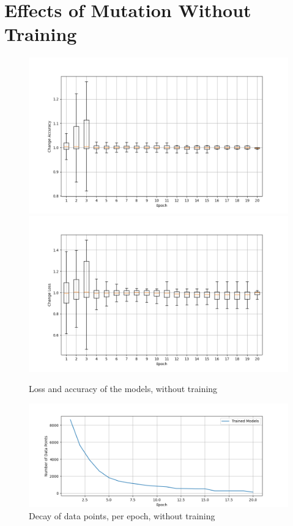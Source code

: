 \section{Effects of Mutation Without Training}\label{sec:effects-of-mutation-without-training}
\begin{figure}
    \centering
    \includegraphics[width=\textwidth]{plots/NotTrained_Change_Acc.png}
    \includegraphics[width=\textwidth]{plots/NotTrained_Change_Loss.png}
    \caption{Loss and accuracy of the models, without training}
    \label{fig:loss-accuracy-Notraining}
\end{figure}
\begin{figure}
    \centering
    \includegraphics[width=\textwidth]{plots/NotTrained_Points_perEpoch.png}
    \caption{Decay of data points, per epoch, without training}
    \label{fig:decay_Notraining}
\end{figure}
